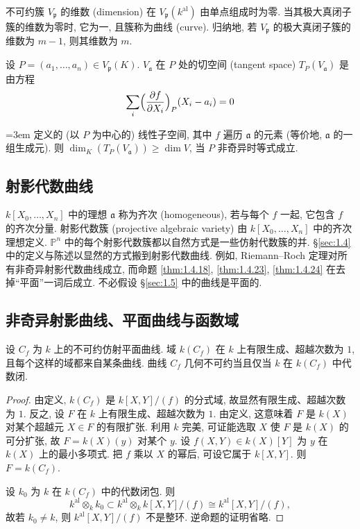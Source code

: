 不可约簇 $V_\mathfrak{p}$ 的维数 (dimension) 在 $V_\mathfrak{p}(k^{\mathrm{al}})$ 由单点组成时为零. 当其极大真闭子簇的维数为零时, 它为一, 且簇称为曲线 (curve). 归纳地, 若 $V_\mathfrak{p}$ 的极大真闭子簇的维数为 $m-1$, 则其维数为 $m$.

设 $P = (a_1,\dots,a_n)\in V_\mathfrak{p}(K)$. $V_\mathfrak{a}$ 在 $P$ 处的切空间 (tangent space) $T_P(V_\mathfrak{a})$ 是由方程
\[
\sum_i\Bigl(\frac{\partial f}{\partial X_i}\Bigr)_P (X_i - a_i) = 0
\]
{\emergencystretch=3em 定义的 (以 $P$ 为中心的) 线性子空间, 其中 $f$ 遍历 $\mathfrak{a}$ 的元素 (等价地, $\mathfrak{a}$ 的一组生成元). 则 $\dim_K(T_P(V_\mathfrak{a}))\ge\dim V$, 当 $P$ 非奇异时等式成立.\par}

\subsection*{射影代数曲线}

$k[X_0,\dots,X_n]$ 中的理想 $\mathfrak{a}$ 称为齐次 (homogeneous), 若与每个 $f$ 一起, 它包含 $f$ 的齐次分量. 射影代数簇 (projective algebraic variety) 由 $k[X_0,\dots,X_n]$ 中的齐次理想定义. $\mathbb{P}^n$ 中的每个射影代数簇都以自然方式是一些仿射代数簇的并. \S\ref{sec:1.4} 中的定义与陈述以显然的方式搬到射影代数曲线. 例如, Riemann--Roch 定理对所有非奇异射影代数曲线成立, 而命题 \ref{thm:1.4.18}, \ref{thm:1.4.23}, \ref{thm:1.4.24} 在去掉``平面''一词后成立. 不必假设 \S\ref{sec:1.5} 中的曲线是平面的.

\subsection*{非奇异射影曲线、平面曲线与函数域}

\begin{proposition} \label{thm:1.6.1} 
设 $C_f$ 为 $k$ 上的不可约仿射平面曲线. 域 $k(C_f)$ 在 $k$ 上有限生成、超越次数为 $1$, 且每个这样的域都来自某条曲线. 曲线 $C_f$ 几何不可约当且仅当 $k$ 在 $k(C_f)$ 中代数闭.
\end{proposition}

\begin{proof}
由定义, $k(C_f)$ 是 $k[X,Y]/(f)$ 的分式域, 故显然有限生成、超越次数为 $1$. 反之, 设 $F$ 在 $k$ 上有限生成、超越次数为 $1$. 由定义, 这意味着 $F$ 是 $k(X)$ 对某个超越元 $X\in F$ 的有限扩张. 利用 $k$ 完美, 可证能选取 $X$ 使 $F$ 是 $k(X)$ 的可分扩张, 故 $F = k(X)(y)$ 对某个 $y$. 设 $f(X,Y)\in k(X)[Y]$ 为 $y$ 在 $k(X)$ 上的最小多项式. 把 $f$ 乘以 $X$ 的幂后, 可设它属于 $k[X,Y]$. 则 $F = k(C_f)$.

设 $k_0$ 为 $k$ 在 $k(C_f)$ 中的代数闭包. 则
\[
k^{\mathrm{al}}\otimes_k k_0\subset k^{\mathrm{al}}\otimes_k k[X,Y]/(f) \cong k^{\mathrm{al}}[X,Y]/(f),
\]
故若 $k_0\neq k$, 则 $k^{\mathrm{al}}[X,Y]/(f)$ 不是整环. 逆命题的证明省略.
\end{proof}

